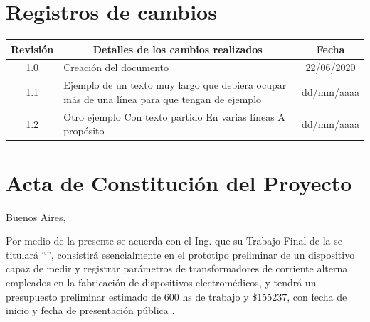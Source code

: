 \documentclass[11pt]{charter}
\begin{document}
\maketitle
\thispagestyle{empty}
\pagebreak


\thispagestyle{empty}
{\setlength{\parskip}{0pt}
\tableofcontents{}
}
\pagebreak


\section{Registros de cambios}
\label{sec:registro}


\begin{table}[ht]
\label{tab:registro}
\centering

\begin{tabularx}{\linewidth}{@{}|c|X|c|@{}}
\hline
\rowcolor[HTML]{C0C0C0} 
Revisión & \multicolumn{1}{c|}{\cellcolor[HTML]{C0C0C0}Detalles de los cambios realizados} & Fecha      \\ \hline
1.0      & Creación del documento                                                          & 22/06/2020 \\ \hline
1.1      & Ejemplo de un texto muy largo que debiera ocupar más de una línea para que tengan de ejemplo                                                                                																						   & dd/mm/aaaa \\ \hline
1.2      & Otro ejemplo \newline
		   Con texto partido \newline
		   En varias líneas \newline
		   A propósito                                                                     & dd/mm/aaaa \\ \hline
\end{tabularx}
\end{table}

\pagebreak



\section{Acta de Constitución del Proyecto}
\label{sec:acta}

\begin{flushright}
Buenos Aires, \fechaInicioName
\end{flushright}

\vspace{2cm}

Por medio de la presente se acuerda con el Ing. \authorname\hspace{1px} que su Trabajo Final de la \degreename\hspace{1px} se titulará ``\ttitle'', consistirá esencialmente en el prototipo preliminar de un dispositivo capaz de medir y registrar parámetros de transformadores de corriente alterna empleados en la fabricación de dispositivos electromédicos, y tendrá un presupuesto preliminar estimado de 600 hs de trabajo y \$155237, con fecha de inicio \fechaInicioName\hspace{1px} y fecha de presentación pública \fechaFinalName.
\end{document}
